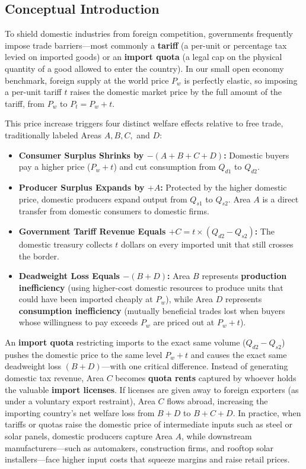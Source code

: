 \documentclass[11pt,letterpaper]{article}
\begin{document}
\subsection*{Conceptual Introduction}
To shield domestic industries from foreign competition, governments frequently impose trade barriers---most commonly a \textbf{tariff} (a per-unit or percentage tax levied on imported goods) or an \textbf{import quota} (a legal cap on the physical quantity of a good allowed to enter the country). In our small open economy benchmark, foreign supply at the world price $P_w$ is perfectly elastic, so imposing a per-unit tariff $t$ raises the domestic market price by the full amount of the tariff, from $P_w$ to $P_t = P_w + t$.

This price increase triggers four distinct welfare effects relative to free trade, traditionally labeled Areas $A, B, C,$ and $D$:
\begin{itemize}
    \item \textbf{Consumer Surplus Shrinks by $-(A + B + C + D)$:} Domestic buyers pay a higher price ($P_w + t$) and cut consumption from $Q_{d1}$ to $Q_{d2}$.
    \item \textbf{Producer Surplus Expands by $+A$:} Protected by the higher domestic price, domestic producers expand output from $Q_{s1}$ to $Q_{s2}$. Area $A$ is a direct transfer from domestic consumers to domestic firms.
    \item \textbf{Government Tariff Revenue Equals $+C = t \times (Q_{d2} - Q_{s2})$:} The domestic treasury collects $t$ dollars on every imported unit that still crosses the border.
    \item \textbf{Deadweight Loss Equals $-(B + D)$:} Area $B$ represents \textbf{production inefficiency} (using higher-cost domestic resources to produce units that could have been imported cheaply at $P_w$), while Area $D$ represents \textbf{consumption inefficiency} (mutually beneficial trades lost when buyers whose willingness to pay exceeds $P_w$ are priced out at $P_w + t$).
\end{itemize}

An \textbf{import quota} restricting imports to the exact same volume ($Q_{d2} - Q_{s2}$) pushes the domestic price to the same level $P_w + t$ and causes the exact same deadweight loss $(B + D)$---with one critical difference. Instead of generating domestic tax revenue, Area $C$ becomes \textbf{quota rents} captured by whoever holds the valuable \textbf{import licenses}. If licenses are given away to foreign exporters (as under a voluntary export restraint), Area $C$ flows abroad, increasing the importing country's net welfare loss from $B + D$ to $B + C + D$. In practice, when tariffs or quotas raise the domestic price of intermediate inputs such as steel or solar panels, domestic producers capture Area $A$, while downstream manufacturers---such as automakers, construction firms, and rooftop solar installers---face higher input costs that squeeze margins and raise retail prices.
\end{document}
